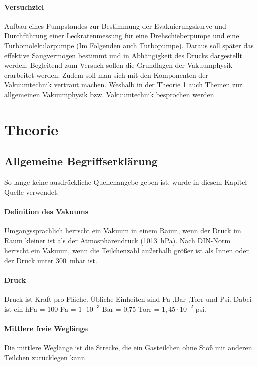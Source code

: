 \paragraph{Versuchziel}
Aufbau eines Pumpstandes zur Bestimmung der Evakuierungskurve und Durchführung einer 
Leckratenmessung für eine Drehschieberpumpe und eine Turbomolekularpumpe 
(Im Folgenden auch Turbopumpe). Daraus soll später das effektive Saugvermögen bestimmt und in 
Abhängigkeit des Drucks dargestellt werden. Begleitend zum Versuch sollen die Grundlagen der 
Vakuumphysik erarbeitet werden. Zudem soll man sich mit den Komponenten der Vakuumtechnik 
vertraut machen. Weshalb in der Theorie \ref{sec:Theorie} auch Themen zur allgemeinen 
Vakuumphysik  bzw. Vakuumtechnik besprochen werden.
\section{Theorie}
\label{sec:Theorie}
\subsection{Allgemeine Begriffserklärung}
So lange keine ausdrückliche Quellenangebe geben ist, wurde in diesem Kapitel 
Quelle \cite{pfeiffer} verwendet.
\paragraph{Definition des Vakuums}
Umgangssprachlich herrscht ein Vakuum in einem Raum, wenn der Druck im Raum kleiner ist als der 
Atmosphärendruck (\SI{1013}{\hecto\pascal}). Nach DIN-Norm herrscht ein Vakuum, wenn 
die Teilchenzahl außerhalb größer ist als Innen oder der Druck unter \SI{300}{\milli\bar} ist.
\paragraph{Druck}
Druck ist Kraft pro Fläche. Übliche Einheiten sind Pa ,Bar ,Torr und 
Psi. Dabei ist ein hPa = 100 Pa = $ 1\cdot10^{-3}$ Bar = 0,75 Torr = $1,45\cdot10^{-2}$ psi.
\paragraph{Mittlere freie Weglänge}
Die mittlere Weglänge ist die Strecke, die ein Gasteilchen ohne Stoß mit anderen Teilchen 
zurücklegen kann. 
